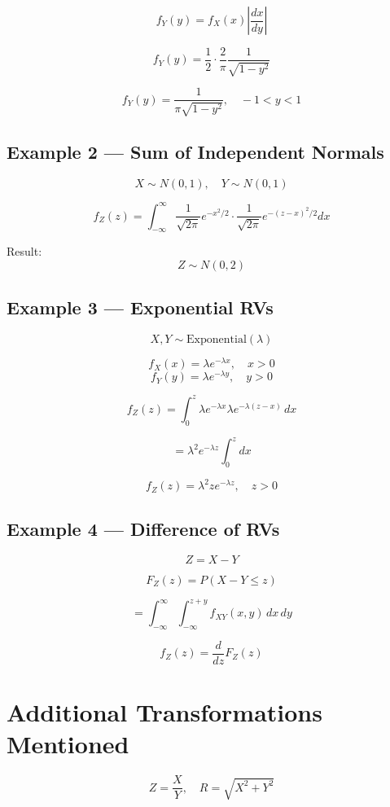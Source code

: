 \documentclass[11pt]{article}
\begin{document}
\[
f_Y(y)=f_X(x)\left|\frac{dx}{dy}\right|
\]

\[
f_Y(y)=\frac12\cdot\frac{2}{\pi}\frac{1}{\sqrt{1-y^2}}
\]

\[
f_Y(y)=\frac{1}{\pi\sqrt{1-y^2}}, \quad -1<y<1
\]

\subsection{Example 2 — Sum of Independent Normals}

\[
X \sim N(0,1), \quad Y \sim N(0,1)
\]

\[
f_Z(z)=\int_{-\infty}^{\infty}
\frac{1}{\sqrt{2\pi}}e^{-x^2/2}
\cdot
\frac{1}{\sqrt{2\pi}}e^{-(z-x)^2/2}
dx
\]

Result:
\[
Z \sim N(0,2)
\]

\subsection{Example 3 — Exponential RVs}

\[
X,Y \sim \text{Exponential}(\lambda)
\]

\[
f_X(x)=\lambda e^{-\lambda x}, \quad x>0
\]
\[
f_Y(y)=\lambda e^{-\lambda y}, \quad y>0
\]

\[
f_Z(z)=\int_0^z
\lambda e^{-\lambda x}
\lambda e^{-\lambda(z-x)}\,dx
\]

\[
=\lambda^2 e^{-\lambda z}\int_0^z dx
\]

\[
f_Z(z)=\lambda^2 z e^{-\lambda z}, \quad z>0
\]

\subsection{Example 4 — Difference of RVs}

\[
Z=X-Y
\]

\[
F_Z(z)=P(X-Y\le z)
\]

\[
=\int_{-\infty}^{\infty}
\int_{-\infty}^{z+y}
f_{XY}(x,y)\,dx\,dy
\]

\[
f_Z(z)=\frac{d}{dz}F_Z(z)
\]

\section{Additional Transformations Mentioned}

\[
Z=\frac{X}{Y}, \quad
R=\sqrt{X^2+Y^2}
\]
\end{document}
